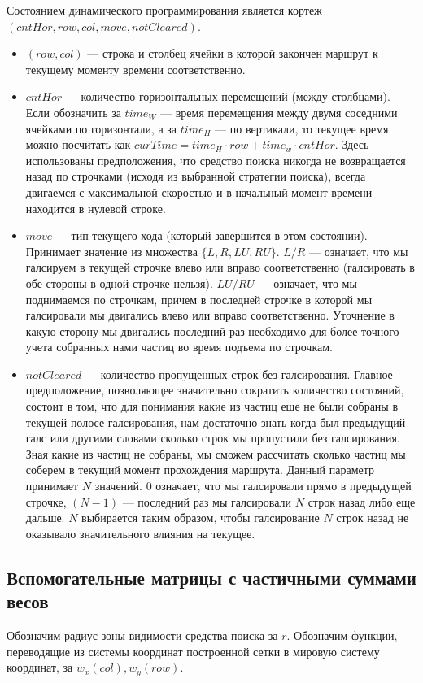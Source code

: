 Состоянием динамического программирования является кортеж $(cntHor, row, col, move, notCleared)$.
\begin{itemize}
\item $(row, col)$ --- строка и столбец ячейки в которой закончен маршрут к текущему моменту времени
соответственно.
\item $cntHor$ --- количество горизонтальных перемещений (между столбцами). Если обозначить
за $time_W$ --- время перемещения между двумя соседними ячейками по горизонтали, а за $time_H$ ---
по вертикали, то текущее время можно посчитать как $curTime = time_H \cdot row + time_w \cdot cntHor$.
Здесь использованы предположения, что средство поиска никогда не возвращается назад по строчками
(исходя из выбранной стратегии поиска), всегда двигаемся с максимальной скоростью и в начальный
момент времени находится в нулевой строке.
\item $move$ --- тип текущего хода (который завершится в этом состоянии). Принимает значение 
из множества $\{L, R, LU, RU\}$. $L/R$ --- означает, что мы галсируем в текущей строчке влево или
вправо соответственно (галсировать  в обе стороны в одной строчке нельзя). 
$LU/RU$ --- означает, что мы поднимаемся по строчкам, причем в последней строчке в которой мы
галсировали мы двигались влево или вправо соответственно. Уточнение в какую сторону мы двигались
последний раз необходимо для более точного учета собранных нами частиц во время подъема по строчкам.
\item $notCleared$ --- количество пропущенных строк без галсирования. Главное предположение,
позволяющее значительно сократить количество состояний, состоит в том, что для понимания
какие из частиц еще не были собраны в текущей полосе галсирования,
нам достаточно знать когда был предыдущий галс или другими словами сколько строк мы пропустили без
галсирования. Зная какие из частиц не собраны, мы сможем рассчитать сколько частиц мы соберем
в текущий момент прохождения маршрута. Данный параметр принимает $N$ значений. $0$ означает,
что мы галсировали прямо в предыдущей строчке, $(N-1)$ --- последний раз мы галсировали $N$ строк
назад либо еще дальше. $N$ выбирается таким образом, чтобы галсирование $N$ строк назад
не оказывало значительного влияния на текущее.
\end{itemize}

\subsection{Вспомогательные матрицы с частичными суммами весов}
Обозначим радиус зоны видимости средства поиска за $r$. Обозначим функции, переводящие
из системы координат построенной сетки в мировую систему координат, за $w_x(col), w_y(row)$.

